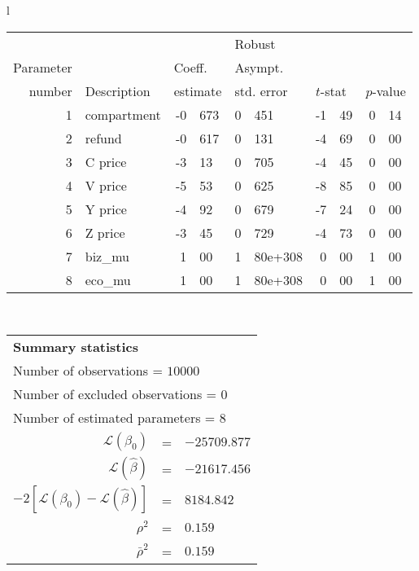   \begin{tabular}{l}
\begin{tabular}{rlr@{.}lr@{.}lr@{.}lr@{.}l}
         &                       &   \multicolumn{2}{l}{}    & \multicolumn{2}{l}{Robust}  &     \multicolumn{4}{l}{}   \\
Parameter &                       &   \multicolumn{2}{l}{Coeff.}      & \multicolumn{2}{l}{Asympt.}  &     \multicolumn{4}{l}{}   \\
number &  Description                     &   \multicolumn{2}{l}{estimate}      & \multicolumn{2}{l}{std. error}  &   \multicolumn{2}{l}{$t$-stat}  &   \multicolumn{2}{l}{$p$-value}   \\

\hline

1 & compartment & -0&673 & 0&451 & -1&49 & 0&14\\
2 & refund & -0&617 & 0&131 & -4&69 & 0&00\\
3 & C price & -3&13 & 0&705 & -4&45 & 0&00\\
4 & V price & -5&53 & 0&625 & -8&85 & 0&00\\
5 & Y price & -4&92 & 0&679 & -7&24 & 0&00\\
6 & Z price & -3&45 & 0&729 & -4&73 & 0&00\\
7 & biz_mu & 1&00 & 1&80e+308 & 0&00 & 1&00\\
8 & eco_mu & 1&00 & 1&80e+308 & 0&00 & 1&00\\
\hline
\end{tabular}
\\
\begin{tabular}{rcl}
\multicolumn{3}{l}{\bf Summary statistics}\\
\multicolumn{3}{l}{ Number of observations = $10000$} \\
\multicolumn{3}{l}{ Number of excluded observations = $0$} \\
\multicolumn{3}{l}{ Number of estimated  parameters = $8$} \\
 $\mathcal{L}(\beta_0)$ &=&  $-25709.877$ \\
 $\mathcal{L}(\hat{\beta})$ &=& $-21617.456 $  \\
 $-2[\mathcal{L}(\beta_0) -\mathcal{L}(\hat{\beta})]$ &=& $8184.842$ \\
    $\rho^2$ &=&   $0.159$ \\
    $\bar{\rho}^2$ &=&    $0.159$ \\
\end{tabular}
  \end{tabular}
